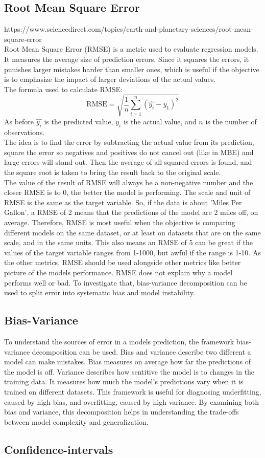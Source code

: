 \newpage

\subsection{Root Mean Square Error}
https://www.sciencedirect.com/topics/earth-and-planetary-sciences/root-mean-square-error    
\\
Root Mean Square Error (RMSE) is a metric used to evaluate regression models. It measures the average size of prediction errors. Since it squares the errors, it punishes larger mistakes harder than smaller ones, which is useful if the objective is to emphasize the impact of larger deviations of the actual values.
\\
The formula used to calculate RMSE:
$$\text{RMSE}=\sqrt{\frac{1}{n}\sum_{i=1}^{n}(\hat{y_i}-y_{1})^2}$$
As before $\hat{y_i}$ is the predicted value, $y_i$ is the actual value, and $n$ is the number of observations.
\\ The idea is to find the error by subtracting the actual value from its prediction, square the error so negatives and positives do not cancel out (like in MBE) and large errors will stand out. Then the average of all squared errors is found, and the square root is taken to bring the result back to the original scale. 
\\

The value of the result of RMSE will always be a non-negative number and the closer RMSE is to 0, the better the model is performing. The scale and unit of RMSE is the same as the target variable. So, if the data is about 'Miles Per Gallon', a RMSE of 2 means that the predictions of the model are 2 miles off, on average. Therefore, RMSE is most useful when the objective is comparing different models on the same dataset, or at least on datasets that are on the same scale, and in the same units. This also means an RMSE of 5 can be great if the values of the target variable ranges from 1-1000, but awful if the range is 1-10. As the other metrics, RMSE should be used alongside other metrics like better picture of the models performance. RMSE does not explain why a model performs well or bad. To investigate that, bias-variance decomposition can be used to split error into systematic bias and model instability.
\newpage

\subsection{Bias-Variance}
To understand the sources of error in a models prediction, the framework bias-variance decomposition can be used. Bias and variance describe two different a model can make mistakes. Bias measures on average how far the predictions of the model is off. Variance describes how sentitive the model is to changes in the training data. It measures how much the model’s predictions vary when it is trained on different datasets. This framework is useful for diagnosing underfitting, caused by high bias, and overfitting, caused by high variance. By examining both bias and variance, this decomposition helps in understanding the trade-offs between model complexity and generalization.
\subsection{Confidence-intervals}

